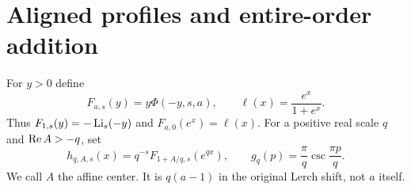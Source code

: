 \section{Aligned profiles and entire-order addition}
\label{clc:sec:analysis}

For $y>0$ define
\begin{equation}\label{clc:eq:F}
 F_{a,s}(y)=y\Phi(-y,s,a),\qquad
 \ell(x)=\frac{e^x}{1+e^x}.
\end{equation}
Thus $F_{1,s}(y)=-\operatorname{Li}_s(-y)$ and $F_{a,0}(e^x)=\ell(x)$.
For a positive real scale $q$ and $\operatorname{Re} A>-q$, set
\begin{equation}\label{clc:eq:h}
 h_{q,A,s}(x)=q^{-s}F_{1+A/q,s}(e^{qx}),\qquad
 g_q(p)=\frac{\pi}{q}\csc\frac{\pi p}{q}.
\end{equation}
We call $A$ the affine center. It is $q(a-1)$ in the original Lerch
shift, not $a$ itself.

